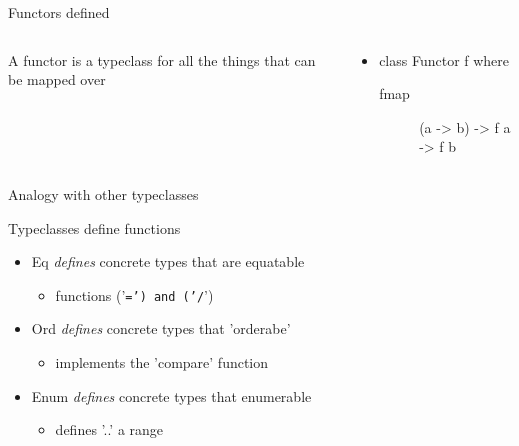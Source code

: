\documentclass[presetation]{beamer}
\begin{document}
\begin{frame}[label={sec:org9c1ab8c}]{Functors defined}
\begin{columns}
\begin{column}{.48\columnwidth}
\begin{definition}[definition]
A functor is a typeclass for all the things that can be mapped over

\pause
\end{definition}
\end{column}
\begin{column}{.48\columnwidth}
\begin{definition}
\begin{itemize}
\item class Functor f where
\begin{description}
\item[{fmap}] (a -> b) -> f a -> f b
\end{description}
\end{itemize}
\end{definition}
\end{column}
\end{columns}
\end{frame}


\begin{frame}[fragile,label={sec:org83c6361}]{Analogy with other typeclasses}
 \begin{block}{Typeclasses define functions}
\begin{itemize}
\item Eq \emph{defines} concrete types that are equatable
\begin{itemize}
\item functions ('\texttt{=') and ('/}')
\end{itemize}
\item Ord \emph{defines} concrete types that 'orderabe'
\begin{itemize}
\item implements the 'compare' function
\end{itemize}
\item Enum \emph{defines} concrete types that enumerable
\begin{itemize}
\item defines '..' a range
\end{itemize}
\end{itemize}
\end{block}
\end{frame}
\end{document}
